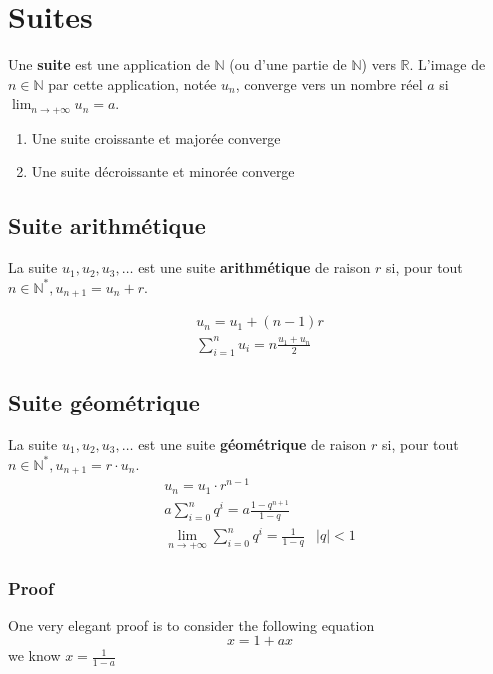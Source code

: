 \chapter{Suites}
Une \textbf{suite} est une application de $\mathbb N$ (ou d'une partie de $\mathbb N$) vers $\mathbb R$. L'image de $n\in\mathbb N$ par cette application, notée $u_n$, converge vers un nombre réel $a$ si $\lim_{n\rightarrow+\infty}u_n=a$.

\begin{enumerate}
	\item Une suite croissante et majorée converge
	\item Une suite décroissante et minorée converge
\end{enumerate}

\section{Suite arithmétique}
La suite $u_1,u_2,u_3,\dots$ est une suite \textbf{arithmétique} de raison $r$ si, pour tout $n\in\mathbb N^*, u_{n+1}=u_n+r$.

\begin{eqnarray}
	u_n=u_1+(n-1)r\\
	\sum_{i=1}^{n}u_i=n\frac{u_1+u_n}{2}
\end{eqnarray}

\section{Suite géométrique}
La suite $u_1,u_2,u_3,\dots$ est une suite \textbf{géométrique} de raison $r$ si, pour tout $n\in\mathbb N^*, u_{n+1}=r\cdot u_n$.
\begin{eqnarray}
	u_n=u_1\cdot r^{n-1}\\
	a \sum_{i=0}^{n} q^{i} =a \frac{1-q^{n+1}}{1-q}\\
	\lim_{n\rightarrow+\infty}\sum_{i=0}^{n} q^{i}=\frac{1}{1-q}&|q|<1
\end{eqnarray}

\subsection{Proof}
One very elegant proof is to consider the following equation
\begin{equation*}
	\label{eq:beginprooffseriegeom}
	x = 1+ax
\end{equation*}
we know $x= \frac{1}{1-a}$

